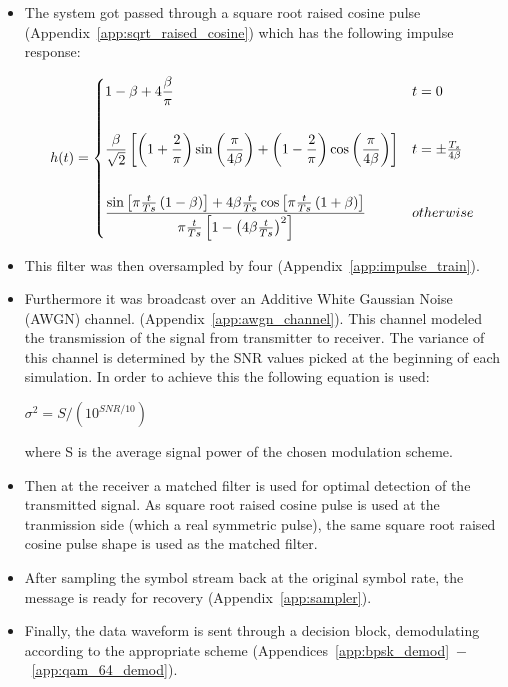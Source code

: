 \documentclass[]{article}
\begin{document}
\begin{itemize}
\item The system got passed through a square root raised cosine pulse (Appendix~\ref{app:sqrt_raised_cosine}) which has the following impulse response:

 \[
 h(t) = \begin{dcases*}
        1-\beta+4\frac{\beta}{\pi} &  $t = 0$\\ \\        
        \frac{\beta}{\sqrt{2}}\left[\left(1+\frac{2}{\pi}\right)\sin\left(\frac{\pi}{4\beta}\right)+\left(1-\frac{2}{\pi}\right)\cos\left(\frac{\pi}{4\beta}\right)\right] & $t=\pm \frac{T_s}{4\beta}$ \\ \\
        \frac{\sin\left[\pi\frac{t}{Ts}\left(1-\beta\right)\right]+4\beta\frac{t}{Ts}\cos\left[\pi\frac{t}{Ts}\left(1+\beta\right)\right]}{\pi\frac{t}{Ts}\left[1-\left(4\beta\frac{t}{Ts}\right)^2\right]} & $otherwise$ \\
        \end{dcases*}
\]

\item This filter was then oversampled by four  (Appendix~\ref{app:impulse_train}).
\item Furthermore it was broadcast over an Additive White Gaussian Noise (AWGN) channel. (Appendix~\ref{app:awgn_channel}). This channel modeled the transmission of the signal from transmitter to receiver. The variance of this channel is determined by the SNR values picked at the beginning of each simulation. In order to achieve this the following equation is used:

$\sigma^2 = S/(10^{SNR/10})$

where S is the average signal power of the chosen modulation scheme.

\item Then at the receiver a matched filter is used for optimal detection of the transmitted signal. As square root raised cosine pulse is used at the tranmission side (which a real symmetric pulse), the same square root raised cosine pulse shape is used as the matched filter.  

\item After sampling the symbol stream back at the original symbol rate, the message is ready for recovery (Appendix~\ref{app:sampler}).

\item Finally, the data waveform is sent through a decision block, demodulating according to the appropriate scheme (Appendices~\ref{app:bpsk_demod}~$-$~\ref{app:qam_64_demod}).

\end{itemize}
\end{document}
